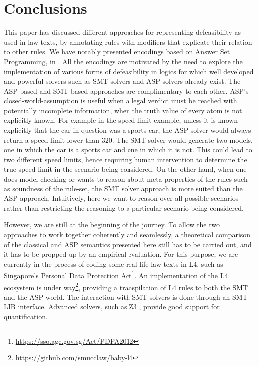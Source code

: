 \section{Conclusions}\label{sec:conclusions}

This paper has discussed different approaches for representing defeasibility
as used in law texts, by annotating rules with modifiers that explicate their
relation to other rules. We have notably presented encodings 
based on Answer Set Programming, in
. All the encodings are motivated by the need to
explore the implementation of various forms of defeasibility in logics for
which well developed and powerful solvers such as SMT solvers and ASP solvers
already exist. The ASP based and SMT based approaches are complimentary to
each other. ASP's closed-world-assumption is useful when a legal verdict must
be reached with potentially incomplete information, when the truth value of
every atom is not explicitly known. For example in the speed limit example,
unless it is known explicitly that the car in question was a sports car, the
ASP solver would always return a speed limit lower than $320$. The SMT solver
would generate two models, one in which the car is a sports car and one in
which it is not. This could lead to two different speed limits, hence
requiring human intervention to determine the true speed limit in the scenario
being considered. On the other hand, when one does model checking or wants to
reason about meta-properties of the rules such as soundness of the rule-set,
the SMT solver approach is more suited than the ASP approach. Intuitively,
here we want to reason over all possible scenarios rather than restricting the
reasoning to a particular scenario being considered.

However, we are still at the beginning of the journey. To allow the two
approaches to work together coherently and seamlessly, a theoretical
comparison of the classical and ASP semantics presented here still has to be
carried out, and it has to be propped up by an empirical evaluation. For this
purpose, we are currently in the process of coding some real-life law texts in
L4, such as Singapore's Personal Data Protection
Act\footnote{\url{https://sso.agc.gov.sg/Act/PDPA2012}}.  An implementation of
the L4 ecosystem is under
way\footnote{\url{https://github.com/smucclaw/baby-l4}}, providing a
transpilation of L4 rules to both the SMT and the ASP world. The interaction
with SMT solvers is done through an SMT-LIB \cite{BarFT_SMTLIB}
interface. Advanced solvers, such as Z3 \cite{demoura_bjorner_z3_2008},
provide good support for quantification.

